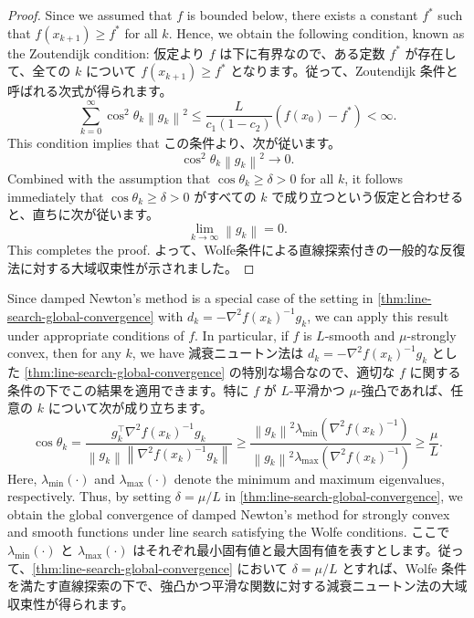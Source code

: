 \documentclass[0_main]{subfiles}
\begin{document}
\begin{proof}
    \ifEn
        Since we assumed that $f$ is bounded below, there exists a constant $f^*$ such that $f(x_{k+1}) \geq f^*$ for all $k$. Hence, we obtain the following condition, known as the Zoutendijk condition:
    \else
        仮定より $f$ は下に有界なので、ある定数 $f^*$ が存在して、全ての $k$ について $f(x_{k+1}) \geq f^*$ となります。従って、Zoutendijk 条件と呼ばれる次式が得られます。
    \fi
    \begin{equation*}
        \sum_{k=0}^\infty \cos^2 \theta_k \left\lVert g_k \right\rVert^2 \leq \frac{L}{c_1 (1 - c_2)} (f(x_0) - f^*) < \infty.
    \end{equation*}
    \ifEn
        This condition implies that
    \else
        この条件より、次が従います。
    \fi
    \begin{equation*}
        \cos^2 \theta_k \left\lVert g_k \right\rVert^2 \to 0.
    \end{equation*}
    \ifEn
        Combined with the assumption that $\cos \theta_k \geq \delta > 0$ for all $k$, it follows immediately that
    \else
        $\cos \theta_k \geq \delta > 0$ がすべての $k$ で成り立つという仮定と合わせると、直ちに次が従います。
    \fi
    \begin{equation*}
        \lim_{k \to \infty} \left\lVert g_k \right\rVert = 0.
    \end{equation*}
    \ifEn
        This completes the proof.
    \else
        よって、Wolfe条件による直線探索付きの一般的な反復法に対する大域収束性が示されました。
    \fi
    \myQED
\end{proof}

\ifEn
    Since damped Newton's method is a special case of the setting in \cref{thm:line-search-global-convergence} with $d_k = -\nabla^2 f(x_k)^{-1} g_k$, we can apply this result under appropriate conditions of $f$. In particular, if $f$ is $L$-smooth and $\mu$-strongly convex, then for any $k$, we have
\else
    減衰ニュートン法は $d_k = -\nabla^2 f(x_k)^{-1} g_k$ とした \cref{thm:line-search-global-convergence} の特別な場合なので、適切な $f$ に関する条件の下でこの結果を適用できます。特に $f$ が $L$-平滑かつ $\mu$-強凸であれば、任意の $k$ について次が成り立ちます。
\fi
\begin{equation*}
    \cos \theta_k
    = \frac{g_k^\top \nabla^2 f(x_k)^{-1} g_k}{\left\lVert g_k \right\rVert\left\lVert \nabla^2 f(x_k)^{-1} g_k \right\rVert}
    \geq \frac{\left\lVert g_k \right\rVert^2 \lambda_{\min}(\nabla^2 f(x_k)^{-1})}{\left\lVert g_k \right\rVert^2 \lambda_{\max}(\nabla^2 f(x_k)^{-1})}
    \geq \frac{\mu}{L}.
\end{equation*}
\ifEn
    Here, $\lambda_{\min}(\cdot)$ and $\lambda_{\max}(\cdot)$ denote the minimum and maximum eigenvalues, respectively. Thus, by setting $\delta = \mu / L$ in \cref{thm:line-search-global-convergence}, we obtain the global convergence of damped Newton's method for strongly convex and smooth functions under line search satisfying the Wolfe conditions.
\else
    ここで $\lambda_{\min}(\cdot)$ と $\lambda_{\max}(\cdot)$ はそれぞれ最小固有値と最大固有値を表すとします。従って、\cref{thm:line-search-global-convergence} において $\delta = \mu / L$ とすれば、Wolfe 条件を満たす直線探索の下で、強凸かつ平滑な関数に対する減衰ニュートン法の大域収束性が得られます。
\fi
\end{document}
